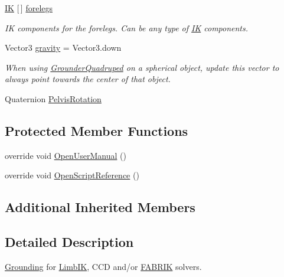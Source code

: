 \begin{DoxyCompactItemize}
\mbox{\hyperlink{class_root_motion_1_1_final_i_k_1_1_i_k}{IK}} \mbox{[}$\,$\mbox{]} \mbox{\hyperlink{class_root_motion_1_1_final_i_k_1_1_grounder_quadruped_a50487adce0ddc122a7a127c9b74148e3}{forelegs}}
\begin{DoxyCompactList}\small\item\em IK components for the forelegs. Can be any type of \mbox{\hyperlink{class_root_motion_1_1_final_i_k_1_1_i_k}{IK}} components. \end{DoxyCompactList}\item 
Vector3 \mbox{\hyperlink{class_root_motion_1_1_final_i_k_1_1_grounder_quadruped_ac94f40f64bc3d052b0dd9121d23cf7b4}{gravity}} = Vector3.\+down
\begin{DoxyCompactList}\small\item\em When using \mbox{\hyperlink{class_root_motion_1_1_final_i_k_1_1_grounder_quadruped}{Grounder\+Quadruped}} on a spherical object, update this vector to always point towards the center of that object. \end{DoxyCompactList}\item 
Quaternion \mbox{\hyperlink{class_root_motion_1_1_final_i_k_1_1_grounder_quadruped_acbf7a45c9eecccca78ad3a133d7babbe}{Pelvis\+Rotation}}
\end{DoxyCompactItemize}
\subsection*{Protected Member Functions}
\begin{DoxyCompactItemize}
\item 
override void \mbox{\hyperlink{class_root_motion_1_1_final_i_k_1_1_grounder_quadruped_a46706210fd77e841924c04b4bf70098b}{Open\+User\+Manual}} ()
\item 
override void \mbox{\hyperlink{class_root_motion_1_1_final_i_k_1_1_grounder_quadruped_ab5958dc0d24bb8a70d2a3ec4f3a7f433}{Open\+Script\+Reference}} ()
\end{DoxyCompactItemize}
\subsection*{Additional Inherited Members}


\subsection{Detailed Description}
\mbox{\hyperlink{class_root_motion_1_1_final_i_k_1_1_grounding}{Grounding}} for \mbox{\hyperlink{class_root_motion_1_1_final_i_k_1_1_limb_i_k}{Limb\+IK}}, C\+CD and/or \mbox{\hyperlink{class_root_motion_1_1_final_i_k_1_1_f_a_b_r_i_k}{F\+A\+B\+R\+IK}} solvers. 



